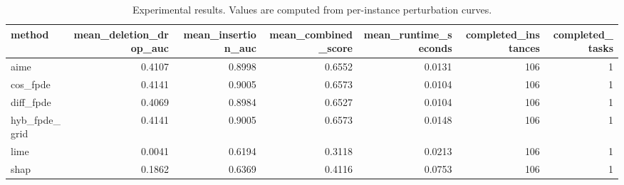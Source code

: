 \begin{table}[t]
\caption{Experimental results. Values are computed from per-instance perturbation curves.}
\label{tab:main_results_computed}
\centering
\begin{tabular}{lrrrrrr}
\toprule
method & mean\_deletion\_drop\_auc & mean\_insertion\_auc & mean\_combined\_score & mean\_runtime\_seconds & completed\_instances & completed\_tasks \\
\midrule
aime & 0.4107 & 0.8998 & 0.6552 & 0.0131 & 106 & 1 \\
cos\_fpde & 0.4141 & 0.9005 & 0.6573 & 0.0104 & 106 & 1 \\
diff\_fpde & 0.4069 & 0.8984 & 0.6527 & 0.0104 & 106 & 1 \\
hyb\_fpde\_grid & 0.4141 & 0.9005 & 0.6573 & 0.0148 & 106 & 1 \\
lime & 0.0041 & 0.6194 & 0.3118 & 0.0213 & 106 & 1 \\
shap & 0.1862 & 0.6369 & 0.4116 & 0.0753 & 106 & 1 \\
\bottomrule
\end{tabular}

\end{table}

